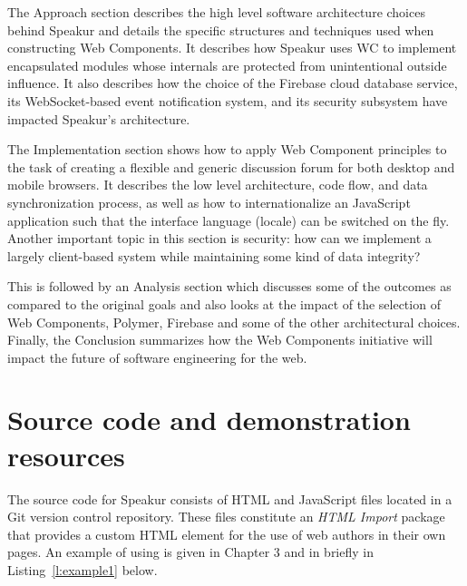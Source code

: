 The Approach section describes the high level software architecture choices behind Speakur and details the specific structures and techniques used when constructing Web Components.
It describes how Speakur uses WC to implement encapsulated modules whose internals are protected from unintentional outside influence. 
It also describes how the choice of the Firebase cloud database service, its WebSocket-based event notification system, and its security subsystem have impacted Speakur's architecture.

The Implementation section shows how to apply Web Component principles to the task of creating a flexible and generic discussion forum for both desktop and mobile browsers. 
It describes the low level architecture, code flow, and data synchronization process, 
as well as how to internationalize an JavaScript application such that the interface language (locale) can be switched on the fly.
Another important topic in this section is security: how can we implement a largely client-based system while maintaining some kind of data integrity?

This is followed by an Analysis section which discusses some of the outcomes 
as compared to the original goals and also looks at the impact of the selection of Web Components, 
Polymer, Firebase and some of the other architectural choices. 
Finally, the Conclusion summarizes how the Web Components initiative will impact the future of software engineering for the web. 

\section{Source code and demonstration resources}
%

The source code for Speakur consists of HTML and JavaScript files located in a Git version control repository. 
These files constitute an \textit{HTML Import} package that provides a
\textbf{}
custom HTML element for the use of web authors in their own pages.
An example of using  is given in Chapter 3 and in briefly in Listing~\ref{l:example1} below.

